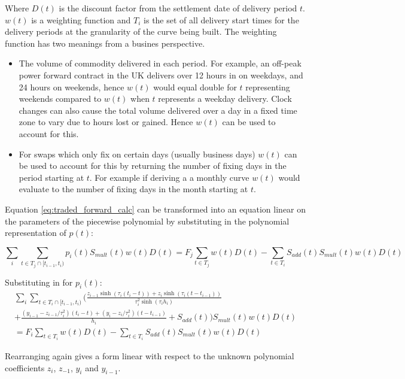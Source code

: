 \documentclass{article}
\begin{document}
Where $D(t)$ is the discount factor from the settlement date of delivery period $t$.
$w(t)$ is a weighting function and $T_i$ is the set of all delivery start times
for the delivery periods at the granularity of the curve being built. The weighting function has two
meanings from a busines perspective.
\begin{itemize}
    \item The volume of commodity delivered in each period. For example, an off-peak power forward 
    contract in the UK delivers over 12 hours in on weekdays, and 24 hours on weekends, hence $w(t)$ 
    would equal double for $t$ representing weekends compared to $w(t)$ when $t$ represents a weekday delivery. 
    Clock changes can also cause the total volume delivered over a day in a fixed time zone to vary 
    due to hours lost or gained. Hence $w(t)$ can be used to account for this.
    \item For swaps which only fix on certain days (usually business days) $w(t)$ can be used to account 
    for this by returning the number of fixing days in the period starting at $t$.
    For example if deriving a a monthly curve $w(t)$ would evaluate to the number of fixing days in the 
    month starting at $t$.
\end{itemize}
Equation \ref{eq:traded_forward_calc} can be transformed into an equation linear on the parameters of the piecewise polynomial by substituting
in the polynomial representation of $p(t)$:

\begin{equation}
    \sum_i \sum_{t \in T_j \cap  [t_{i-1}, t_i) } p_i(t) S_{mult}(t)w(t)D(t) = 
    F_j \sum_{t \in T_j} w(t) D(t) - \sum_{t \in T_i} S_{add}(t) S_{mult}(t)w(t)D(t)
\end{equation}



Substituting in for $p_i(t)$:
\begin{multline}
    \sum_i \sum_{t \in T_i \cap  [t_{i-1}, t_i)} \biggl( \frac{z_{i-1} \sinh(\tau_i (t_i - t)) + z_i \sinh(\tau_i (t - t_{i-1}))}{\tau_i^2 \sinh(\tau_i h_i)}  \\
    + \frac{(y_{i-1} - z_{i-1}/\tau_i^2)(t_i - t) + (y_i - z_i/\tau_i^2)(t - t_{i-1})}{h_i} + 
    S_{add}(t) \biggr) S_{mult}(t)w(t)D(t) \\
    = F_i \sum_{t \in T_i} w(t)D(t) - \sum_{t \in T_i} S_{add}(t) S_{mult}(t)w(t)D(t)
\end{multline}


Rearranging again gives a form linear with respect to the unknown polynomial coefficients
$z_i$, $z_{-1}$, $y_i$ and $y_{i-1}$.
\end{document}
